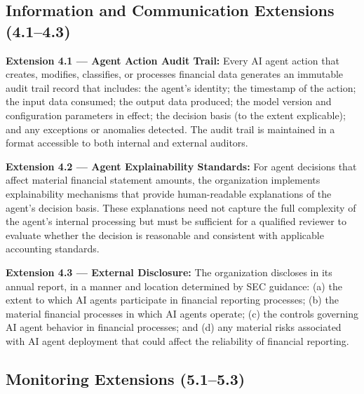\documentclass[12pt]{article}
\begin{document}
\subsection{Information and Communication Extensions (4.1--4.3)}

\begin{definitionbox}
\textbf{Extension 4.1 --- Agent Action Audit Trail:} Every AI agent action that creates, modifies, classifies, or processes financial data generates an immutable audit trail record that includes: the agent's identity; the timestamp of the action; the input data consumed; the output data produced; the model version and configuration parameters in effect; the decision basis (to the extent explicable); and any exceptions or anomalies detected. The audit trail is maintained in a format accessible to both internal and external auditors.
\end{definitionbox}

\begin{definitionbox}
\textbf{Extension 4.2 --- Agent Explainability Standards:} For agent decisions that affect material financial statement amounts, the organization implements explainability mechanisms that provide human-readable explanations of the agent's decision basis. These explanations need not capture the full complexity of the agent's internal processing but must be sufficient for a qualified reviewer to evaluate whether the decision is reasonable and consistent with applicable accounting standards.
\end{definitionbox}

\begin{definitionbox}
\textbf{Extension 4.3 --- External Disclosure:} The organization discloses in its annual report, in a manner and location determined by SEC guidance: (a) the extent to which AI agents participate in financial reporting processes; (b) the material financial processes in which AI agents operate; (c) the controls governing AI agent behavior in financial processes; and (d) any material risks associated with AI agent deployment that could affect the reliability of financial reporting.
\end{definitionbox}

\subsection{Monitoring Extensions (5.1--5.3)}
\end{document}
